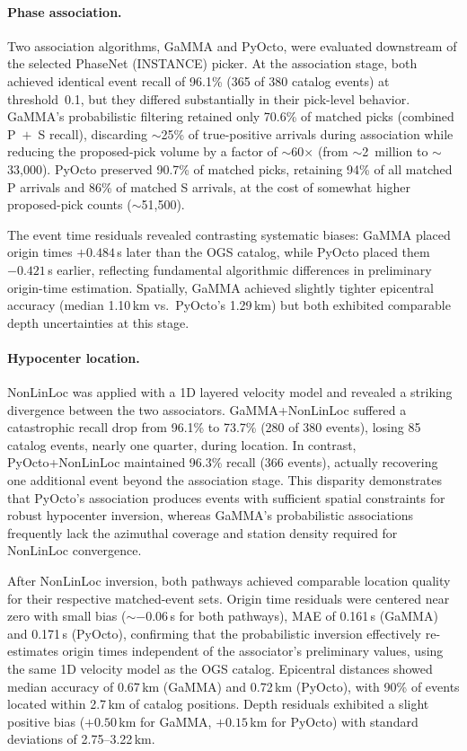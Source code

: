 \paragraph{Phase association.}
Two association algorithms, GaMMA and PyOcto, were evaluated downstream of the
selected PhaseNet (INSTANCE) picker. At the association stage, both achieved
identical event recall of 96.1\% (365 of 380 catalog events) at threshold~0.1,
but they differed substantially in their pick-level behavior. GaMMA's
probabilistic filtering retained only 70.6\% of matched picks (combined P~$+$~S
recall), discarding $\sim$25\% of true-positive arrivals during association
while reducing the proposed-pick volume by a factor of $\sim$60$\times$ (from
$\sim$2~million to $\sim$33,000). PyOcto preserved 90.7\% of matched picks,
retaining 94\% of all matched P arrivals and 86\% of matched S arrivals, at the
cost of somewhat higher proposed-pick counts ($\sim$51,500).

The event time residuals revealed contrasting systematic biases: GaMMA placed
origin times $+0.484$\,s later than the OGS catalog, while PyOcto placed them
$-0.421$\,s earlier, reflecting fundamental algorithmic differences in
preliminary origin-time estimation. Spatially, GaMMA achieved slightly tighter
epicentral accuracy (median 1.10\,km vs.\ PyOcto's 1.29\,km) but both exhibited
comparable depth uncertainties at this stage.

\paragraph{Hypocenter location.}
NonLinLoc was applied with a 1D layered velocity model and revealed a striking
divergence between the two associators. GaMMA+NonLinLoc suffered a catastrophic
recall drop from 96.1\% to 73.7\% (280 of 380 events), losing 85 catalog
events, nearly one quarter, during location. In contrast, PyOcto+NonLinLoc
maintained 96.3\% recall (366 events), actually recovering one additional event
beyond the association stage. This disparity demonstrates that PyOcto's
association produces events with sufficient spatial constraints for robust
hypocenter inversion, whereas GaMMA's probabilistic associations frequently
lack the azimuthal coverage and station density required for NonLinLoc
convergence.

After NonLinLoc inversion, both pathways achieved comparable location quality
for their respective matched-event sets. Origin time residuals were centered
near zero with small bias ($\sim -0.06$\,s for both pathways), MAE of 0.161\,s
(GaMMA) and 0.171\,s (PyOcto), confirming that the probabilistic inversion
effectively re-estimates origin times independent of the associator's
preliminary values, using the same 1D velocity model as the OGS catalog.
Epicentral distances showed median accuracy of 0.67\,km (GaMMA) and 0.72\,km
(PyOcto), with 90\% of events located within 2.7\,km of catalog positions.
Depth residuals exhibited a slight positive bias ($+0.50$\,km for GaMMA,
$+0.15$\,km for PyOcto) with standard deviations of 2.75--3.22\,km.

